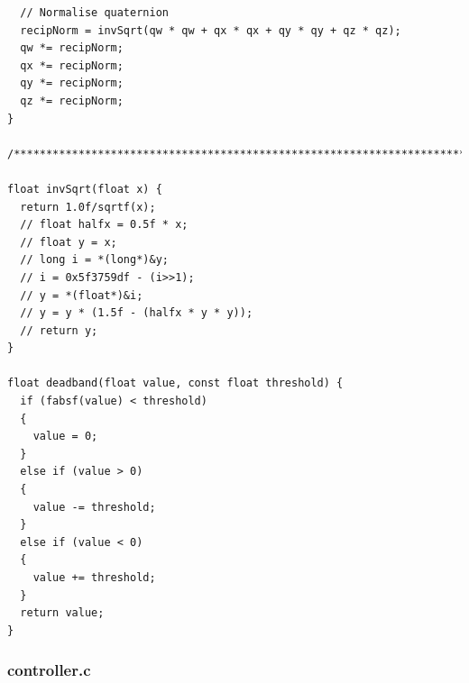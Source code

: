 \begin{lstlisting}
  // Normalise quaternion
  recipNorm = invSqrt(qw * qw + qx * qx + qy * qy + qz * qz);
  qw *= recipNorm;
  qx *= recipNorm;
  qy *= recipNorm;
  qz *= recipNorm;
}

/**********************************************************************/

float invSqrt(float x) {
  return 1.0f/sqrtf(x);
  // float halfx = 0.5f * x;
  // float y = x;
  // long i = *(long*)&y;
  // i = 0x5f3759df - (i>>1);
  // y = *(float*)&i;
  // y = y * (1.5f - (halfx * y * y));
  // return y;
}

float deadband(float value, const float threshold) {
  if (fabsf(value) < threshold)
  {
    value = 0;
  }
  else if (value > 0)
  {
    value -= threshold;
  }
  else if (value < 0)
  {
    value += threshold;
  }
  return value;
}
\end{lstlisting}

\pagebreak
\subsubsection{controller.c}


